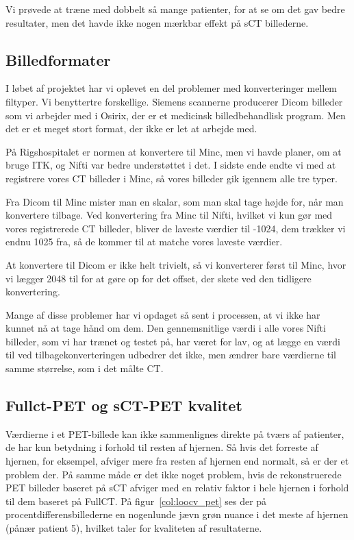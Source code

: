 Vi prøvede at træne med dobbelt så mange patienter, for at se om det gav bedre resultater, men det havde ikke nogen mærkbar effekt på sCT billederne.


\subsection{Billedformater}

I løbet af projektet har vi oplevet en del problemer med konverteringer
mellem filtyper. Vi benyttertre forskellige. Siemens scannerne producerer
Dicom billeder som vi arbejder med i Osirix, der er et medicinsk
billedbehandlisk program. Men det er et meget stort format, der ikke er
let at arbejde med. 

På Rigshospitalet er normen at konvertere til Minc, men vi havde planer,
om at bruge ITK, og Nifti var bedre understøttet i det. I sidste ende
endte vi med at registrere vores CT billeder i Minc, så vores billeder gik
igennem alle tre typer. 

Fra Dicom til Minc mister man en skalar, som man skal tage højde for, når
man konvertere tilbage. Ved konvertering fra Minc til Nifti, hvilket vi
kun gør med vores registrerede CT billeder, bliver de laveste værdier til
-1024, dem trækker vi endnu 1025 fra, så de kommer til at matche vores
laveste værdier.


At konvertere til Dicom er ikke helt trivielt, så vi konverterer først til
Minc, hvor vi lægger 2048 til for at gøre op for det offset, der skete ved
den tidligere konvertering. 

Mange af disse problemer har vi opdaget så sent i processen, at vi ikke
har kunnet nå at tage hånd om dem. Den gennemsnitlige værdi i alle vores
Nifti billeder, som vi har trænet og testet på, har været for lav, og at
lægge en værdi til ved tilbagekonverteringen udbedrer det ikke, men ændrer
bare værdierne til samme størrelse, som i det målte CT.


\subsection{Fullct-PET og sCT-PET kvalitet}


Værdierne i et PET-billede kan ikke sammenlignes direkte på tværs af patienter, de har kun betydning i forhold til resten af hjernen. Så hvis det forreste af hjernen, for eksempel, afviger mere fra resten af hjernen end normalt, så er der et problem der. På samme måde er det ikke noget problem, hvis de rekonstruerede PET billeder baseret på sCT afviger med en relativ faktor i hele hjernen i forhold til dem baseret på FullCT. På figur~\ref{col:loocv_pet} ses der på procentdifferensbillederne en nogenlunde jævn grøn nuance i det meste af hjernen (pånær patient 5), hvilket taler for kvaliteten af resultaterne. 


